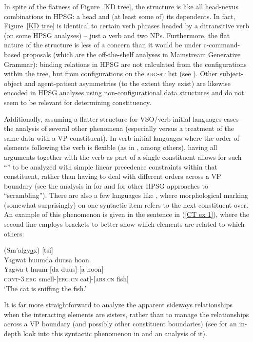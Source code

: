 \documentclass[output=paper
 	        ,biblatex
                ,babelshorthands
                ,newtxmath
                ,draftmode
                ,colorlinks, citecolor=brown
]{langscibook}
\begin{document}
In spite of the flatness of Figure~\ref{KD tree}, the structure is like all head-nexus combinations in HPSG: a head and (at least some of) its dependents. In fact, Figure~\ref{KD tree} is identical to certain verb phrases headed by a ditransitive verb (on some HPSG analyses) -- just a verb and two NPs. Furthermore, the flat nature of the structure is less of a concern than it would be under c-command-based proposals (which are the off-the-shelf analyses in Mainstream Generative Grammar): binding relations in HPSG are not calculated from the configurations within the tree, but from configurations on the \textsc{arg-st} list (see ). Other subject-object and agent-patient asymmetries (to the extent they exist) are likewise encoded in HPSG analyses using non-configurational data structures and do not seem to be relevant for determining constituency.

Additionally, assuming a flatter structure for VSO/verb-initial languages eases the analysis of several other phenomena (especially versus a treatment of the same data with a VP constituent). In verb-initial languages where the order of elements following the verb is flexible (as in , among others), having all arguments together with the verb as part of a single constituent allows for such ``'' to be analyzed with simple linear precedence constraints within that constituent, rather than having to deal with different orders across a VP boundary (see the analysis in \citealt[Chapter~3]{ball08thesis} for  and  for other HPSG approaches to ``scrambling''). There are also a few languages like , where morphological marking (somewhat surprisingly) on one syntactic item refers to the next constituent over. An example of this phenomenon is given in the  sentence in (\ref{CT ex 1}), where the second line employs brackets to better show which elements are related to which others:        
%
\begin{samepage}
\begin{exe}
\ex\label{CT ex 1}  (Sm'algy\underline{a}x) [tsi] \citep[32]{mulder94} \\
 Yagwat huumda duusa hoon. \\
\gll Yagwa-t huum-[da duus]-[a hoon] \\
 \textsc{cont}-\textsc{3.erg} smell-[\textsc{erg.cn} cat]-[\textsc{abs.cn} fish] \\
\trans `The cat is sniffing the fish.' 
\end{exe}
\end{samepage}
%
It is far more straightforward to analyze the apparent sideways relationships when the interacting elements are sisters, rather than to manage the relationships across a VP boundary (and possibly other constituent boundaries) (see \citealt{ball11} for an in-depth look into this syntactic phenomenon in  and an analysis of it).  
\end{document}
